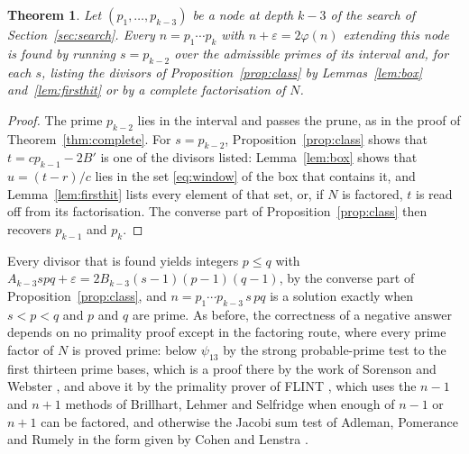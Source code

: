 \documentclass[screen,reqno]{aomart}
\numberwithin{equation}{section}
\theoremstyle{plain}
\newtheorem{theorem}{Theorem}[section]
\theoremstyle{definition}
\theoremstyle{remark}
\begin{document}
\begin{theorem}\label{thm:three}
Let $(p_1,\dots,p_{k-3})$ be a node at depth $k-3$ of the search of
Section~\ref{sec:search}. Every $n=p_1\cdots p_k$ with
$n+\varepsilon=2\varphi(n)$ extending this node is found by running
$s=p_{k-2}$ over the admissible primes of its interval and, for each
$s$, listing the divisors of Proposition~\ref{prop:class} by
Lemmas~\ref{lem:box} and~\ref{lem:firsthit} or by a complete
factorisation of $N$.
\end{theorem}

\begin{proof}
The prime $p_{k-2}$ lies in the interval and passes the prune, as in
the proof of Theorem~\ref{thm:complete}. For $s=p_{k-2}$,
Proposition~\ref{prop:class} shows that $t=cp_{k-1}-2B'$ is one of the
divisors listed: Lemma~\ref{lem:box} shows that $u=(t-r)/c$ lies in
the set \eqref{eq:window} of the box that contains it, and
Lemma~\ref{lem:firsthit} lists every element of that set, or, if
$N$ is factored, $t$ is read off from its factorisation. The converse part of
Proposition~\ref{prop:class} then recovers $p_{k-1}$ and $p_k$.
\end{proof}

Every divisor that is found yields integers $p\le q$ with
$A_{k-3}spq+\varepsilon=2B_{k-3}(s-1)(p-1)(q-1)$, by the converse part
of Proposition~\ref{prop:class}, and $n=p_1\cdots p_{k-3}\,s\,pq$ is a
solution exactly when $s<p<q$ and $p$ and $q$ are prime. As before, the correctness of a
negative answer depends on no primality proof except in the factoring
route, where every prime factor of $N$ is proved prime: below
$\psi_{13}$ by the strong probable-prime test to the first thirteen
prime bases, which is a proof there by the work of Sorenson and
Webster \cite{SW17}, and above it by the primality prover of FLINT
\cite{FLINT}, which uses the $n-1$ and $n+1$ methods of Brillhart,
Lehmer and Selfridge \cite{BLS75} when enough of $n-1$ or $n+1$ can be
factored, and otherwise the Jacobi sum test of Adleman, Pomerance and
Rumely \cite{APR83} in the form given by Cohen and Lenstra \cite{CL84}.
\end{document}
